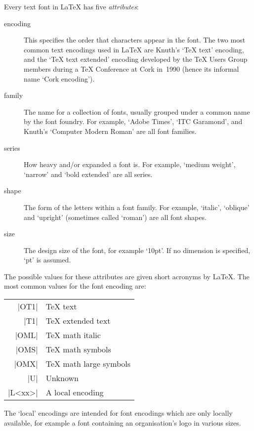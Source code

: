 \documentclass{ltxguide}[1995/11/28]
\begin{document}
Every text font in \LaTeX{} has five \emph{attributes}:
\begin{description}
 
\item[encoding] This specifies the order that characters appear in the
   font.  The two most common text encodings used in \LaTeX{} are
   Knuth's `\TeX{} text' encoding, and the `\TeX{} text extended'
   encoding developed by the \TeX{} Users Group members during a \TeX{}
   Conference at Cork in~1990 (hence its informal name `Cork encoding').
 
\item[family] The name for a collection of fonts, usually grouped under
   a common name by the font foundry.  For example, `Adobe Times', `ITC
   Garamond', and Knuth's `Computer Modern Roman' are all font families.
 
\item[series] How heavy and/or expanded a font is.  For example, `medium
   weight', `narrow' and `bold extended' are all series.
 
\item[shape] The form of the letters within a font family.  For
   example, `italic', `oblique' and `upright' (sometimes called
   `roman') are all font shapes.
 
\item[size] The design size of the font, for example `10pt'. If no
   dimension is specified, `pt' is assumed.
 
\end{description}
The possible values for these attributes are given short acronyms by
\LaTeX.  The most common values for the font encoding are:
\begin{center}
\begin{minipage}{.7\linewidth}
   \begin{tabular}{rl}
      |OT1|   & \TeX{} text  \\
      |T1|    & \TeX{} extended text \\
      |OML|   & \TeX{} math italic \\
      |OMS|   & \TeX{} math symbols \\
      |OMX|   & \TeX{} math large symbols \\
      |U|     & Unknown \\
      |L<xx>| & A local encoding
   \end{tabular}
\end{minipage}
\end{center}
The `local' encodings are intended for font encodings which are only
locally available, for example a font containing an organisation's
logo in various sizes.
 
\end{document}
